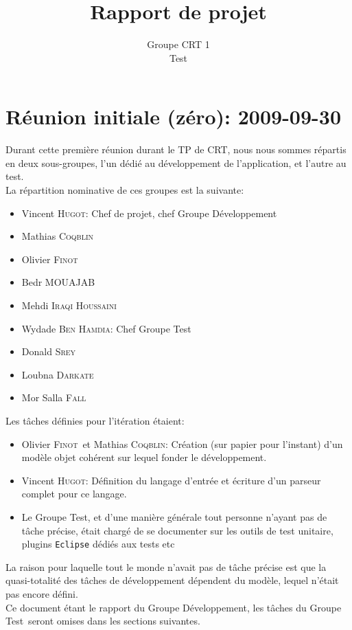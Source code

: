 \documentclass[a4paper,12pt]{article}
\author{Groupe CRT 1\\Test}
\title{Rapport de projet}
\def\familyname{\textsc}
\def\firstname#1{#1}
\def\groupmember#1#2{\firstname{#1} \familyname{#2}}
\def\mwyd{\groupmember{Wydade}{Ben Hamdia}}
\def\mmat{\groupmember{Mathias}{Coqblin}}
\def\mlou{\groupmember{Loubna}{Darkate}}
\def\mmor{\groupmember{Mor Salla}{Fall}}
\def\moli{\groupmember{Olivier}{Finot}}
\def\mvin{\groupmember{Vincent}{Hugot}}
\def\mmed{\groupmember{Mehdi}{Iraqi Houssaini}}
\def\mbed{\groupmember{Bedr}{MOUAJAB}}
\def\mdon{\groupmember{Donald}{Srey}}
\def\grpd{Groupe Développement}
\def\grpt{Groupe Test}
\begin{document}
 
\maketitle

\tableofcontents

\section{Réunion initiale (zéro): 2009-09-30}

Durant cette première réunion durant le TP de CRT, nous 
nous sommes répartis en deux sous-groupes, l'un dédié au développement
de l'application, et l'autre au test.\mk\\
%
La répartition nominative de ces groupes est la suivante:
\begin{itemize}
\item \mvin : Chef de projet, chef \grpd
\item \mmat
\item \moli
\item \mbed
\item \mmed
\end{itemize}


\begin{itemize}
\item \mwyd : Chef \grpt
\item \mdon
\item \mlou
\item \mmor
\end{itemize}


\noi Les tâches définies pour l'itération étaient:

\begin{itemize}
 \item \moli\ et \mmat: Création (sur papier pour l'instant) d'un modèle objet cohérent sur lequel fonder le développement.
\item  \mvin : Définition du langage d'entrée et écriture d'un parseur complet pour ce langage.
\item Le \grpt, et d'une manière générale tout personne n'ayant pas de tâche précise,
était chargé de se documenter sur les outils de test
unitaire, plugins \texttt{Eclipse} dédiés aux tests etc
\end{itemize}
La raison pour laquelle tout le monde n'avait pas de tâche précise est que la 
quasi-totalité des tâches de développement dépendent du modèle, lequel n'était 
pas encore défini.\mk\\
%
Ce document étant le rapport du \grpd, les tâches du \grpt\ seront
omises dans les sections suivantes.
\end{document}
